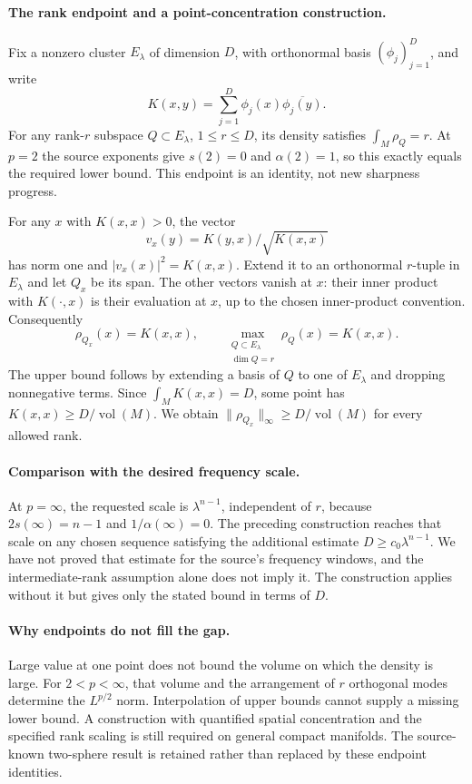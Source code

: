 \documentclass[11pt]{article}
\begin{document}
\paragraph{The rank endpoint and a point-concentration construction.}
Fix a nonzero cluster $E_\lambda$ of dimension $D$, with orthonormal basis $(\phi_j)_{j=1}^D$, and write
\[
 K(x,y)=\sum_{j=1}^D\phi_j(x)\overline{\phi_j(y)}.
\]
For any rank-$r$ subspace $Q\subset E_\lambda$, $1\leq r\leq D$, its density satisfies
$\int_M\rho_Q=r$.
At $p=2$ the source exponents give $s(2)=0$ and $\alpha(2)=1$, so this exactly equals the required lower bound. This endpoint is an identity, not new sharpness progress.

For any $x$ with $K(x,x)>0$, the vector
\[
 v_x(y)=K(y,x)/\sqrt{K(x,x)}
\]
has norm one and $|v_x(x)|^2=K(x,x)$. Extend it to an orthonormal $r$-tuple in $E_\lambda$ and let $Q_x$ be its span. The other vectors vanish at $x$: their inner product with $K(\cdot,x)$ is their evaluation at $x$, up to the chosen inner-product convention. Consequently
\[
 \rho_{Q_x}(x)=K(x,x),\qquad
 \max_{\substack{Q\subset E_\lambda\\\dim Q=r}}\rho_Q(x)=K(x,x).
\]
The upper bound follows by extending a basis of $Q$ to one of $E_\lambda$ and dropping nonnegative terms. Since $\int_M K(x,x)=D$, some point has $K(x,x)\geq D/\operatorname{vol}(M)$. We obtain $\|\rho_{Q_x}\|_\infty\geq D/\operatorname{vol}(M)$ for every allowed rank.

\paragraph{Comparison with the desired frequency scale.}
At $p=\infty$, the requested scale is $\lambda^{n-1}$, independent of $r$, because $2s(\infty)=n-1$ and $1/\alpha(\infty)=0$. The preceding construction reaches that scale on any chosen sequence satisfying the additional estimate $D\geq c_0\lambda^{n-1}$. We have not proved that estimate for the source's frequency windows, and the intermediate-rank assumption alone does not imply it. The construction applies without it but gives only the stated bound in terms of $D$.

\paragraph{Why endpoints do not fill the gap.}
Large value at one point does not bound the volume on which the density is large. For $2<p<\infty$, that volume and the arrangement of $r$ orthogonal modes determine the $L^{p/2}$ norm. Interpolation of upper bounds cannot supply a missing lower bound. A construction with quantified spatial concentration and the specified rank scaling is still required on general compact manifolds. The source-known two-sphere result is retained rather than replaced by these endpoint identities.
\end{document}
